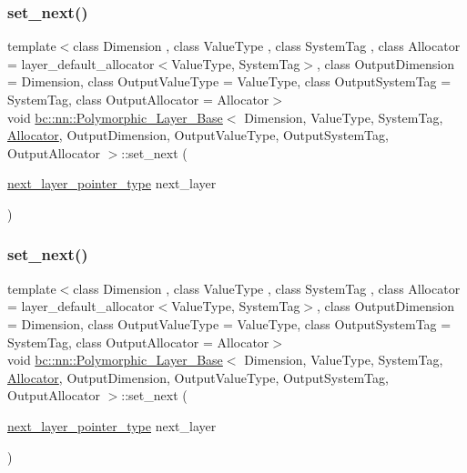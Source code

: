 \subsubsection{\texorpdfstring{set\+\_\+next()}{set\_next()}\hspace{0.1cm}{\footnotesize\ttfamily [1/2]}}
{\footnotesize\ttfamily template$<$class Dimension , class Value\+Type , class System\+Tag , class Allocator  = layer\+\_\+default\+\_\+allocator$<$\+Value\+Type, System\+Tag$>$, class Output\+Dimension  = Dimension, class Output\+Value\+Type  = Value\+Type, class Output\+System\+Tag  = System\+Tag, class Output\+Allocator  = Allocator$>$ \\
void \hyperlink{structbc_1_1nn_1_1Polymorphic__Layer__Base}{bc\+::nn\+::\+Polymorphic\+\_\+\+Layer\+\_\+\+Base}$<$ Dimension, Value\+Type, System\+Tag, \hyperlink{classbc_1_1allocators_1_1Allocator}{Allocator}, Output\+Dimension, Output\+Value\+Type, Output\+System\+Tag, Output\+Allocator $>$\+::set\+\_\+next (\begin{DoxyParamCaption}\item[{\hyperlink{structbc_1_1nn_1_1Polymorphic__Layer__Base_a6f8d2b06bb46d0ef96d0857df2544731}{next\+\_\+layer\+\_\+pointer\+\_\+type}}]{next\+\_\+layer }\end{DoxyParamCaption})\hspace{0.3cm}{\ttfamily [inline]}}

\mbox{\label{structbc_1_1nn_1_1Polymorphic__Layer__Base_a852126e97fd34bcc24c446615e3df3fa}} 
\subsubsection{\texorpdfstring{set\+\_\+next()}{set\_next()}\hspace{0.1cm}{\footnotesize\ttfamily [2/2]}}
{\footnotesize\ttfamily template$<$class Dimension , class Value\+Type , class System\+Tag , class Allocator  = layer\+\_\+default\+\_\+allocator$<$\+Value\+Type, System\+Tag$>$, class Output\+Dimension  = Dimension, class Output\+Value\+Type  = Value\+Type, class Output\+System\+Tag  = System\+Tag, class Output\+Allocator  = Allocator$>$ \\
void \hyperlink{structbc_1_1nn_1_1Polymorphic__Layer__Base}{bc\+::nn\+::\+Polymorphic\+\_\+\+Layer\+\_\+\+Base}$<$ Dimension, Value\+Type, System\+Tag, \hyperlink{classbc_1_1allocators_1_1Allocator}{Allocator}, Output\+Dimension, Output\+Value\+Type, Output\+System\+Tag, Output\+Allocator $>$\+::set\+\_\+next (\begin{DoxyParamCaption}\item[{\hyperlink{structbc_1_1nn_1_1Polymorphic__Layer__Base_a6f8d2b06bb46d0ef96d0857df2544731}{next\+\_\+layer\+\_\+pointer\+\_\+type}}]{next\+\_\+layer }\end{DoxyParamCaption})\hspace{0.3cm}{\ttfamily [inline]}}

